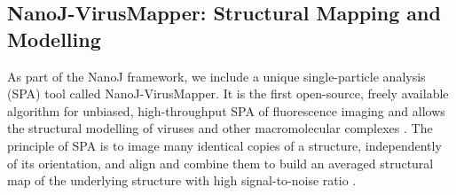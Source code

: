 \subsection*{NanoJ-VirusMapper: Structural Mapping and Modelling}
 As part of the NanoJ framework, we include a unique single-particle analysis (SPA) tool called NanoJ-VirusMapper. It is the first open-source, freely available algorithm for unbiased, high-throughput SPA of fluorescence imaging and allows the structural modelling of viruses and other macromolecular complexes \cite{gray2016virusmapper,gray2017open,gray2018nanoscale}. The principle of SPA is to image many identical copies of a structure, independently of its orientation, and align and combine them to build an averaged structural map of the underlying structure with high signal-to-noise ratio \cite{szymborska2013nuclear,laine2015structural,lelek2012superresolution,verdier2017single,sieben2018multicolor}. 
 
